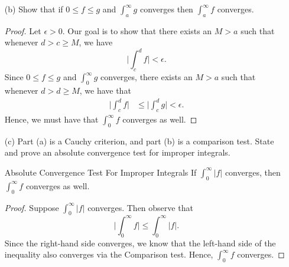\begin{enumerate}
\begin{proof}
        Now assume the converse. Let \( \varepsilon > 0 \). We want to show that 
        \[  \lim_{ n \to \infty  }  \int_{ a }^{ a + n }  f  = L. \] By assumption, there exists a natural number \( N > a     \) such that whenever \( a + n > n \geq N  \), we have 
        \begin{align*}
            \Big| \int_{ a }^{ a + n  } f  -  L  \Big| &= \Big| \Big(  \int_{ a }^{ n  }  f  + \int_{ n }^{ a + n } f \Big)  - L  \Big|  \\
                                                       &= \Big| \Big( \int_{ a }^{ n }  f   -L \Big)  + \int_{ n }^{  a+ n } f   \Big| \\
                                                       &\leq \Big| \int_{ a }^{ n } f  - L  \Big| + \Big| \int_{ n }^{ a+n  } f  \Big| \\
                                                       &< \frac{ \varepsilon  }{ 2  } + \frac{ \varepsilon  }{ 2  }  \\
                                                       &= \varepsilon.
        \end{align*}
        \end{proof}
    \item[(b)] Show that if \( 0 \leq f \leq g  \) and \( \int_{ a }^{ \infty  } g   \) converges then \( \int_{ a }^{ \infty  } f   \) converges.
        \begin{proof}
        Let \( \epsilon > 0  \). Our goal is to show that there exists an \( M > a  \) such that whenever \(  d > c \geq M  \), we have 
        \[  \Big| \int_{ c }^{ d }  f  \Big| < \epsilon.  \] 
        Since \(  0 \leq  f \leq  g  \) and \( \int_{ 0 }^{ \infty  }  g   \) converges, there exists an \( M > a  \) such that whenever \( d > d \geq M  \), we have that   
        \begin{align*}
            \Big| \int_{ c }^{ d } f  \Big| &\leq \Big| \int_{ c }^{ d }  g  \Big|  
                                            < \epsilon. 
        \end{align*}
        Hence, we must have that \( \int_{ 0 }^{ \infty  } f  \) converges as well.
        \end{proof}
    \item[(c)] Part (a) is a Cauchy criterion, and part (b) is a comparison test. State and prove an absolute convergence test for improper integrals.  
        \begin{definition}{Absolute Convergence Test For Improper Integrals}{}
        If \( \int_{ 0 }^{ \infty  } | f |   \) converges, then  \( \int_{ 0 }^{ \infty  }  f   \) converges as well.
        \end{definition}
        \begin{proof}
        Suppose \( \int_{ 0 }^{ \infty  } | f |   \) converges. Then observe that 
        \[  \Big| \int_{ 0 }^{ \infty  } f  \Big| \leq \int_{ 0 }^{ \infty  }  | f | . \] Since the right-hand side converges, we know that the left-hand side of the inequality also converges via the Comparison test. Hence, \( \int_{ 0 }^{ \infty  } f    \) converges.
        \end{proof}
\end{enumerate}
